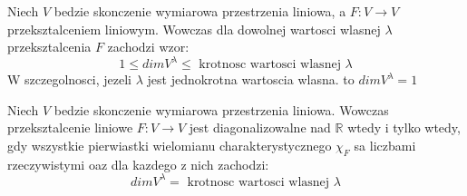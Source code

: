 \documentclass{article}
\begin{document}
\begin{tcolorbox}[colback=white!90!green,colframe=black!35!green,title=Fakt 3.14 Krotnosc wartosci wlasnej]

Niech $V$ bedzie skonczenie wymiarowa przestrzenia liniowa, a $F: V \rightarrow V$ przeksztalceniem liniowym. Wowczas dla dowolnej wartosci wlasnej $\lambda$ przeksztalcenia $F$ zachodzi wzor: $$ 1 \leq dimV^{\lambda} \leq \text{ krotnosc wartosci wlasnej } \lambda $$
W szczegolnosci, jezeli $\lambda$ jest jednokrotna wartoscia wlasna. to $dimV^{\lambda} = 1$

\end{tcolorbox}

\begin{tcolorbox}[colback=white!90!green,colframe=black!35!green,title=Wniosek 3.15 Diagonalizowalnosc przeksztalcenia nad $\mathbb{R}$]    

Niech $V$ bedzie skonczenie wymiarowa przestrzenia liniowa. Wowczas przeksztalcenie liniowe $F: V \rightarrow V$ jest diagonalizowalne nad $\mathbb{R}$ wtedy i tylko wtedy, gdy wszystkie pierwiastki wielomianu charakterystycznego ${\chi}_{F}$ sa liczbami rzeczywistymi oaz dla kazdego z nich zachodzi:
$$dimV^{\lambda} = \text{ krotnosc wartosci wlasnej } \lambda$$

\end{tcolorbox}
\end{document}
